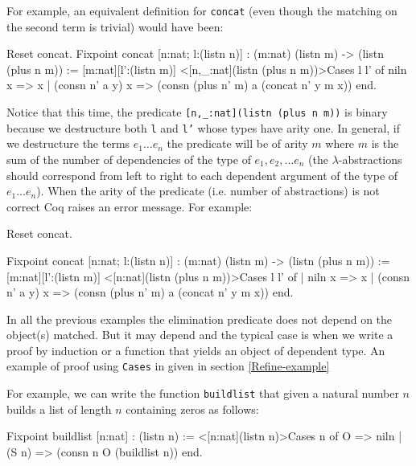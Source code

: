 For example, an equivalent definition for \texttt{concat} (even though the matching on the second term is trivial) would have
been:

\begin{coq_example}
Reset concat.
Fixpoint concat [n:nat; l:(listn n)] : (m:nat) (listn m) -> (listn (plus n m)) 
:= [m:nat][l':(listn m)] 
    <[n,_:nat](listn (plus n m))>Cases l l' of 
                     niln          x => x
                  | (consn n' a y) x => (consn (plus n' m) a (concat n' y m x))
                  end.
\end{coq_example}

Notice that this time, the predicate \texttt{[n,\_:nat](listn (plus n
  m))}  is binary because we
destructure both \texttt{l} and \texttt{l'} whose types have arity one.
In general, if we destructure the terms $e_1\ldots e_n$
the predicate will be of arity $m$ where $m$ is the sum of the
number of dependencies of the type of $e_1, e_2,\ldots e_n$ 
(the $\lambda$-abstractions
should correspond from left to right to each dependent argument of the
type of $e_1\ldots e_n$).
When the arity of the predicate (i.e. number of abstractions) is not
correct Coq raises an error message. For example:

\begin{coq_eval}
Reset concat.
\end{coq_eval}

\begin{coq_example}
Fixpoint concat [n:nat; l:(listn n)] 
     : (m:nat) (listn m) -> (listn (plus n m)) := 
  [m:nat][l':(listn m)] 
   <[n:nat](listn (plus n m))>Cases l l' of 
        | niln          x => x
        | (consn n' a y) x => (consn (plus n' m) a (concat n' y m x))
        end.
\end{coq_example}

In all the previous examples the elimination predicate does not depend
on the object(s) matched. But it may depend and the typical case 
is when we write a proof by induction or a function that yields an
object of dependent type. An example of proof using \texttt{Cases} in
given in section \ref{Refine-example}

For example, we can write 
the function \texttt{buildlist} that given a natural number
$n$ builds a list of length $n$ containing zeros as follows:

\begin{coq_example}
Fixpoint buildlist [n:nat] : (listn n) :=
    <[n:nat](listn n)>Cases n of 
           O    => niln 
       |  (S n) => (consn n O (buildlist n))
       end.
\end{coq_example}

